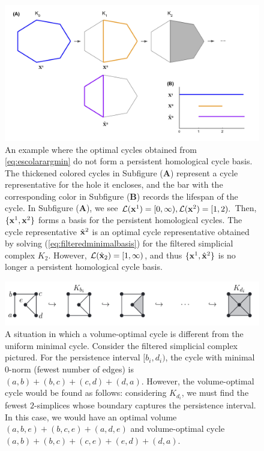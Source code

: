 \begin{figure}[h!]
\begin{center}
\includegraphics[width=1\textwidth]{figures/gregExample.jpg}
\end{center}
\caption{An example where the optimal cycles obtained from \pr \eqref{eq:escolarargmin} do not form a persistent homological cycle basis. The thickened colored cycles in Subfigure (\textbf{A}) represent a cycle representative for the hole it encloses, and the bar with the corresponding color in Subfigure (\textbf{B}) records the lifespan of the cycle. In Subfigure (\textbf{A}), we see $\mathcal{L}(\mathbf{x}^1) = [0,\infty), \mathcal{L}(\mathbf{x}^2) = [1,2).$ Then, $\{\mathbf{x}^1, \mathbf{x}^2\}$ forms a basis for the persistent homological cycles. The cycle representative $\hat {\mathbf{x}}^2$ is an optimal cycle representative obtained by solving \pr (\ref{eq:filteredminimalbasis}) for the filtered simplicial complex $K_2$. However, $\mathcal{L}(\hat {\mathbf{x}}_2) = [1, \infty)$, and thus  $\{\mathbf{x}^1, \hat {\mathbf{x}}^2\}$ is no longer a persistent homological cycle basis.} \label{fig:example-persBasis}
\end{figure}


 \begin{figure}[h!]
\begin{center}
\includegraphics[width=1\textwidth]{figures/volumeexample.jpg}
\end{center}
\caption{A situation in which a volume-optimal cycle is different from the uniform minimal cycle. Consider the filtered simplicial complex pictured. For the persistence interval $[b_i,d_i)$, the cycle with minimal $0$-norm (fewest number of edges) is $(a,b) + (b,c) + (c,d)  + (d,a)$.
However, the volume-optimal cycle would be found as follows: considering $K_{d_i}$, we must find the fewest $2$-simplices whose boundary captures the persistence interval. In this case, we would have an optimal volume $(a,b,e) + (b,c,e) + (a,d,e)$ and volume-optimal cycle $(a,b) + (b,c) + (c,e) + (e,d) + (d,a)$. 
}\label{fig:volumeoptimal}
\end{figure} 


